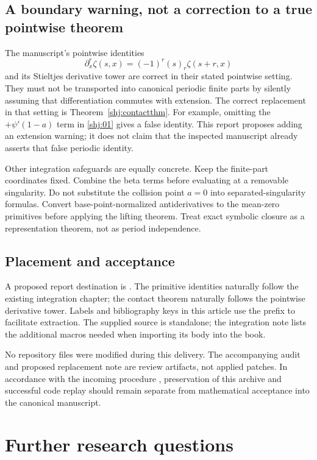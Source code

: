 \subsection{A boundary warning, not a correction to a true pointwise theorem}
The manuscript's pointwise identities
\[
\partial_x^r\zeta(s,x)=(-1)^r(s)_r\zeta(s+r,x)
\]
and its Stieltjes derivative tower are correct in their stated pointwise setting. They must not be transported into canonical periodic finite parts by silently assuming that differentiation commutes with extension. The correct replacement in that setting is Theorem~\ref{shj:contactthm}. For example, omitting the $+\psi'(1-a)$ term in \eqref{shj:01} gives a false identity. This report proposes adding an extension warning; it does not claim that the inspected manuscript already asserts that false periodic identity.

Other integration safeguards are equally concrete. Keep the finite-part coordinates fixed. Combine the beta terms before evaluating at a removable singularity. Do not substitute the collision point $a=0$ into separated-singularity formulas. Convert base-point-normalized antiderivatives to the mean-zero primitives before applying the lifting theorem. Treat exact symbolic closure as a representation theorem, not as period independence.

\subsection{Placement and acceptance}
A proposed report destination is
.
The primitive identities naturally follow the existing integration chapter; the contact theorem naturally follows the pointwise derivative tower. Labels and bibliography keys in this article use the prefix  to facilitate extraction. The supplied source is standalone; the integration note lists the additional macros needed when importing its body into the book.

No repository files were modified during this delivery. The accompanying audit and proposed replacement note are review artifacts, not applied patches. In accordance with the incoming procedure \cite{shj:incoming}, preservation of this archive and successful code replay should remain separate from mathematical acceptance into the canonical manuscript.

\section{Further research questions}\label{shj:further}
